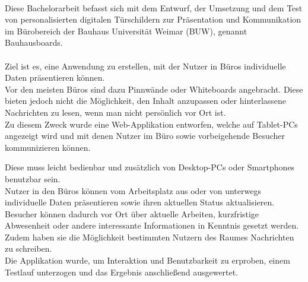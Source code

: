 \\
Diese Bachelorarbeit befasst sich mit dem Entwurf, der Umsetzung und dem Test von personalisierten
digitalen Türschildern zur Präsentation und Kommunikation im Bürobereich der Bauhaus Universität Weimar (BUW), genannt Bauhausboards.
\\\\
Ziel ist es, eine Anwendung zu erstellen, mit der Nutzer in Büros individuelle Daten präsentieren können.
\\
Vor den meisten Büros sind dazu Pinnwände oder Whiteboards angebracht.
Diese bieten jedoch nicht die Möglichkeit, den Inhalt anzupassen oder hinterlassene Nachrichten zu lesen, wenn man nicht persönlich vor Ort ist.
\\
Zu diesem Zweck wurde eine Web-Applikation entworfen, welche auf Tablet-PCs angezeigt wird und mit denen Nutzer im Büro sowie vorbeigehende Besucher kommunizieren können.

Diese muss leicht bedienbar und zusätzlich von Desktop-PCs oder Smartphones benutzbar sein.
\\
Nutzer in den Büros können vom Arbeitsplatz aus oder von unterwegs individuelle Daten präsentieren sowie ihren aktuellen Status aktualisieren.
\\
Besucher können dadurch vor Ort über aktuelle Arbeiten, kurzfristige Abwesenheit oder andere interessante Informationen in Kenntnis gesetzt werden.
Zudem haben sie die Möglichkeit bestimmten Nutzern des Raumes Nachrichten zu schreiben.
\\
Die Applikation wurde, um Interaktion und Benutzbarkeit zu erproben, einem Testlauf unterzogen und das Ergebnis anschließend ausgewertet.